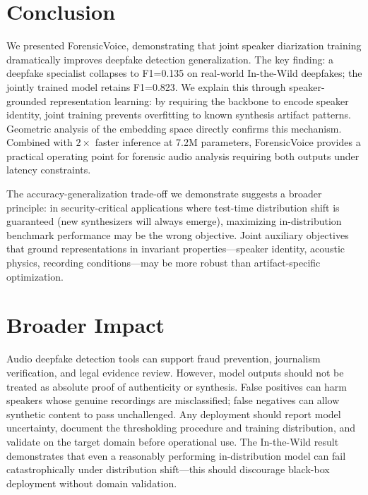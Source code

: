 \documentclass{article}
\newcommand{\fv}{ForensicVoice}
\begin{document}
\section{Conclusion}

We presented \fv{}, demonstrating that joint speaker diarization training
dramatically improves deepfake detection generalization. The key finding:
a deepfake specialist collapses to F1=0.135 on real-world In-the-Wild
deepfakes; the jointly trained model retains F1=0.823. We explain this through
speaker-grounded representation learning: by requiring the backbone to
encode speaker identity, joint training prevents overfitting to known synthesis
artifact patterns. Geometric analysis of the embedding space directly confirms
this mechanism. Combined with $2\times$ faster inference at 7.2M parameters,
\fv{} provides a practical operating point for forensic audio analysis requiring
both outputs under latency constraints.

The accuracy-generalization trade-off we demonstrate suggests a broader
principle: in security-critical applications where test-time distribution shift
is guaranteed (new synthesizers will always emerge), maximizing in-distribution
benchmark performance may be the wrong objective. Joint auxiliary objectives
that ground representations in invariant properties---speaker identity, acoustic
physics, recording conditions---may be more robust than artifact-specific
optimization.

\section{Broader Impact}

Audio deepfake detection tools can support fraud prevention, journalism
verification, and legal evidence review. However, model outputs should not be
treated as absolute proof of authenticity or synthesis. False positives can harm
speakers whose genuine recordings are misclassified; false negatives can allow
synthetic content to pass unchallenged. Any deployment should report model
uncertainty, document the thresholding procedure and training distribution, and
validate on the target domain before operational use. The In-the-Wild result
demonstrates that even a reasonably performing in-distribution model can fail
catastrophically under distribution shift---this should discourage black-box
deployment without domain validation.
\end{document}
